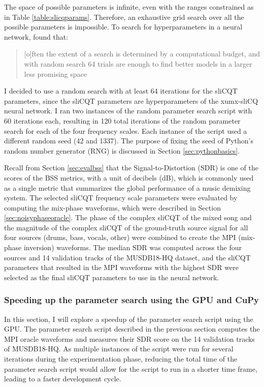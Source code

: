 \documentclass[report.tex]{subfiles}
\begin{document}
The space of possible parameters is infinite, even with the ranges constrained as in Table \ref{table:slicqparams}. Therefore, an exhaustive grid search over all the possible parameters is impossible. To search for hyperparameters in a neural network, \textcite{randomgrid} found that:

\begin{quote}
	[o]ften the extent of a search is determined by a computational budget, and with random search 64 trials are enough to find better models in a larger less promising space \parencite[293]{randomgrid}
\end{quote}

I decided to use a random search with at least 64 iterations for the sliCQT parameters, since the sliCQT parameters are hyperparameters of the xumx-sliCQ neural network. I ran two instances of the random parameter search script with 60 iterations each, resulting in 120 total iterations of the random parameter search for each of the four frequency scales. Each instance of the script used a different random seed (42 and 1337). The purpose of fixing the seed of Python's random number generator (RNG) is discussed in Section \ref{sec:pythonbasics}.

Recall from Section \ref{sec:evalbss} that the Signal-to-Distortion (SDR) is one of the scores of the BSS metrics, with a unit of decibels (dB), which is commonly used as a single metric that summarizes the global performance of a music demixing system. The selected sliCQT frequency scale parameters were evaluated by computing the mix-phase waveforms, which were described in Section \ref{sec:noisyphaseoracle}. The phase of the complex sliCQT of the mixed song and the magnitude of the complex sliCQT of the ground-truth source signal for all four sources (drums, bass, vocals, other) were combined to create the MPI (mix-phase inversion) waveforms. The median SDR was computed across the four sources and 14 validation tracks of the MUSDB18-HQ dataset, and the sliCQT parameters that resulted in the MPI waveforms with the highest SDR were selected as the final sliCQT parameters to use in the neural network.

\subsubsection{Speeding up the parameter search using the GPU and CuPy}
\label{sec:fasterbsscupy}

In this section, I will explore a speedup of the parameter search script using the GPU. The parameter search script described in the previous section computes the MPI oracle waveforms and measures their SDR score on the 14 validation tracks of MUSDB18-HQ. As multiple instances of the script were run for several iterations during the experimentation phase, reducing the total time of the parameter search script would allow for the script to run in a shorter time frame, leading to a faster development cycle.
\end{document}
